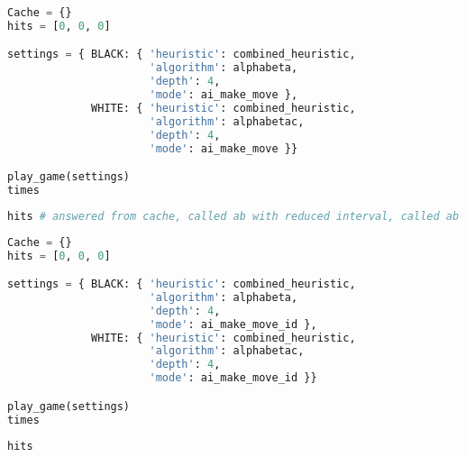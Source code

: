 \begin{lstlisting}[language=Python]
Cache = {}
hits = [0, 0, 0]

settings = { BLACK: { 'heuristic': combined_heuristic,
                      'algorithm': alphabeta,
                      'depth': 4,
                      'mode': ai_make_move },
             WHITE: { 'heuristic': combined_heuristic,
                      'algorithm': alphabetac,
                      'depth': 4,
                      'mode': ai_make_move }}

play_game(settings)
times
\end{lstlisting}

\begin{lstlisting}[language=Python]
hits # answered from cache, called ab with reduced interval, called ab normal
\end{lstlisting}

\begin{lstlisting}[language=Python]
Cache = {}
hits = [0, 0, 0]

settings = { BLACK: { 'heuristic': combined_heuristic,
                      'algorithm': alphabeta,
                      'depth': 4,
                      'mode': ai_make_move_id },
             WHITE: { 'heuristic': combined_heuristic,
                      'algorithm': alphabetac,
                      'depth': 4,
                      'mode': ai_make_move_id }}

play_game(settings)
times
\end{lstlisting}

\begin{lstlisting}[language=Python]
hits
\end{lstlisting}

